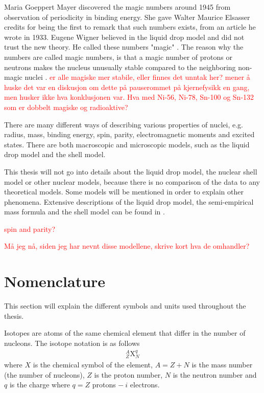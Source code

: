 \documentclass[twoside,english]{uiofysmaster/uiofysmaster}
\begin{document}
Maria Goeppert Mayer discovered the magic numbers around 1945 from observation of periodicity in binding energy. 
She gave Walter Maurice Elsasser credits for being the first to remark that such numbers exists, from an article he wrote in 1933. 
Eugene Wigner believed in the liquid drop model and did not trust the new theory. 
He called these numbers "magic" \cite{Mayer1964, MIT-OCW}. 
The reason why the numbers are called magic numbers, is that a magic number of protons or neutrons makes the nucleus unusually stable compared to the neighboring non-magic nuclei \cite{Mayer1964}. 
\textcolor{red}{er alle magiske mer stabile, eller finnes det unntak her? mener å huske det var en diskusjon om dette på pauserommet på kjernefysikk en gang, men husker ikke hva konklusjonen var. Hva med Ni-56, Ni-78, Sn-100 og Sn-132 som er dobbelt magiske og radioaktive?}


There are many different ways of describing various properties of nuclei, e.g. radius, mass, binding energy, spin, parity, electromagnetic moments and excited states.
There are both macroscopic and microscopic models, such as the liquid drop model and the shell model. 

This thesis will not go into details about the liquid drop model, the nuclear shell model or other nuclear models, because there is no comparison of the data to any theoretical models.
Some models will be mentioned in order to explain other phenomena.
Extensive descriptions of the liquid drop model, the semi-empirical mass formula and the shell model can be found in \cite{Krane}.


\textcolor{red}{spin and parity?}

\textcolor{red}{Må jeg nå, siden jeg har nevnt disse modellene, skrive kort hva de omhandler?}




\section{Nomenclature}
This section will explain the different symbols and units used throughout the thesis.

Isotopes are atoms of the same chemical element that differ in the number of nucleons.
The isotope notation is as follows
\begin{align*}
	^A_Z\text{X}_N^q
\end{align*}
where $X$ is the chemical symbol of the element, $A = Z + N$ is the mass number (the number of nucleons), $Z$ is the proton number, $N$ is the neutron number and $q$ is the charge where $q = Z$ protons $- ~i$ electrons. 
\end{document}
